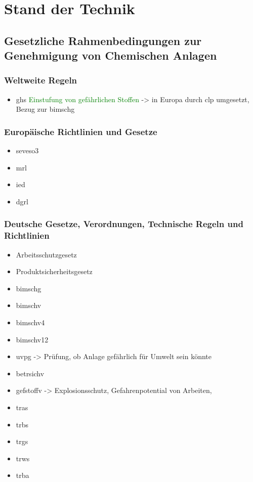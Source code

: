 \chapter{Stand der Technik} \label{ch:sdt}
\section{Gesetzliche Rahmenbedingungen zur Genehmigung von Chemischen Anlagen}
\subsection{Weltweite Regeln}
\begin{itemize}
\item \ac{ghs} \textcolor{green}{Einstufung von gef\"ahrlichen Stoffen} -> in Europa durch \ac{clp} umgesetzt, Bezug zur \ac{bimschg}
\end{itemize}
\subsection{Europ\"aische Richtlinien und Gesetze}
\begin{itemize}
\item \ac{seveso3}
\item \ac{mrl}
\item \ac{ied}
\item \ac{dgrl}
\end{itemize}
\subsection{Deutsche Gesetze, Verordnungen, Technische Regeln und Richtlinien}
\begin{itemize}
\item Arbeitsschutzgesetz
\item Produktsicherheitsgesetz
\item \ac{bimschg}
\item \ac{bimschv}
\item \ac{bimschv4}
\item \ac{bimschv12}
\item \ac{uvpg} -> Pr\"ufung, ob Anlage gef\"ahrlich f\"ur Umwelt sein k\"onnte
\item \ac{betrsichv}
\item \ac{gefstoffv} -> Explosionsschutz, Gefahrenpotential von Arbeiten, 
\item \ac{tras}
\item \ac{trbs}
\item \ac{trgs}
\item \ac{trws}
\item \ac{trba}
\end{itemize}
